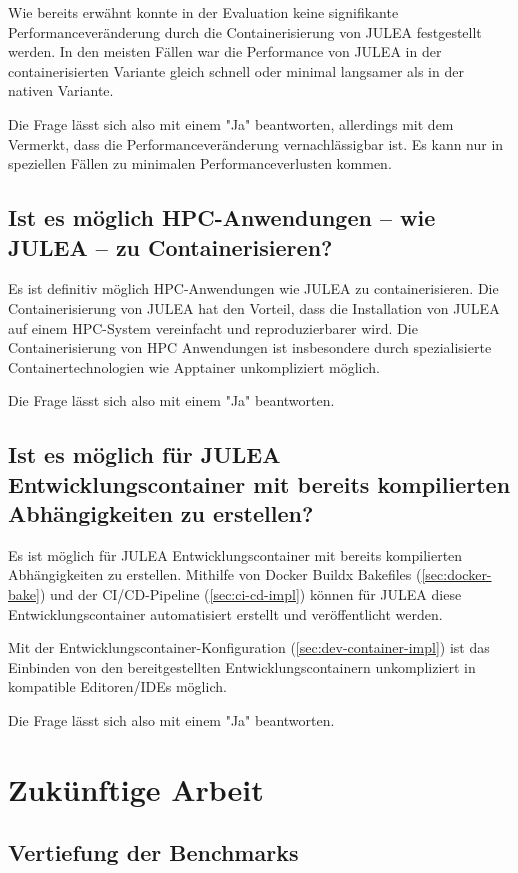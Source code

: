 Wie bereits erwähnt konnte in der Evaluation keine signifikante Performanceveränderung durch die Containerisierung von JULEA festgestellt werden. In den meisten Fällen war die Performance von JULEA in der containerisierten Variante gleich schnell oder minimal langsamer als in der nativen Variante. 

Die Frage lässt sich also mit einem "Ja" beantworten, allerdings mit dem Vermerkt, dass die Performanceveränderung vernachlässigbar ist. Es kann nur in speziellen Fällen zu minimalen Performanceverlusten kommen.

\subsection{Ist es möglich HPC-Anwendungen – wie JULEA – zu Containerisieren?}

Es ist definitiv möglich HPC-Anwendungen wie JULEA zu containerisieren. Die Containerisierung von JULEA hat den Vorteil, dass die Installation von JULEA auf einem HPC-System vereinfacht und reproduzierbarer wird. Die Containerisierung von HPC Anwendungen ist insbesondere durch spezialisierte Containertechnologien wie Apptainer unkompliziert möglich.  

Die Frage lässt sich also mit einem "Ja" beantworten.

\subsection{Ist es möglich für JULEA Entwicklungscontainer mit bereits kompilierten Abhängigkeiten zu erstellen?}

Es ist möglich für JULEA Entwicklungscontainer mit bereits kompilierten Abhängigkeiten zu erstellen. Mithilfe von Docker Buildx Bakefiles (\cref{sec:docker-bake}) und der CI/CD-Pipeline (\cref{sec:ci-cd-impl}) können für JULEA diese Entwicklungscontainer automatisiert erstellt und veröffentlicht werden. 

Mit der Entwicklungscontainer-Konfiguration (\cref{sec:dev-container-impl}) ist das Einbinden von den bereitgestellten Entwicklungscontainern unkompliziert in kompatible Editoren/IDEs möglich. 

Die Frage lässt sich also mit einem "Ja" beantworten.

\section{Zukünftige Arbeit}

\subsection{Vertiefung der Benchmarks}

